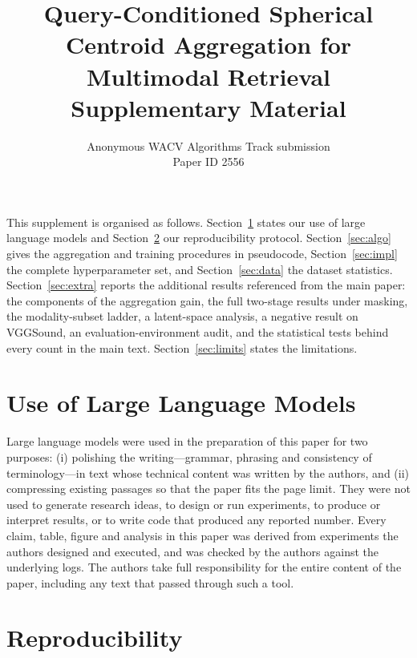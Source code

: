 \documentclass[10pt,twocolumn,letterpaper]{article}
\title{\Large Query-Conditioned Spherical Centroid Aggregation for\\
       Multimodal Retrieval\\[2mm]
       \large Supplementary Material}
\author{Anonymous WACV Algorithms Track submission\\Paper ID 2556}
\date{}
\begin{document}
\maketitle

\noindent
This supplement is organised as follows. Section~\ref{sec:llm} states our use of
large language models and Section~\ref{sec:repro} our reproducibility protocol.
Section~\ref{sec:algo} gives the aggregation and training procedures in
pseudocode, Section~\ref{sec:impl} the complete hyperparameter set, and
Section~\ref{sec:data} the dataset statistics. Section~\ref{sec:extra} reports
the additional results referenced from the main paper: the components of the
aggregation gain, the full two-stage results under masking, the modality-subset
ladder, a latent-space analysis, a negative result on VGGSound, an
evaluation-environment audit, and the statistical tests behind every count in
the main text. Section~\ref{sec:limits} states the limitations.

\section{Use of Large Language Models}
\label{sec:llm}

Large language models were used in the preparation of this paper for two
purposes: (i) polishing the writing---grammar, phrasing and consistency of
terminology---in text whose technical content was written by the authors, and
(ii) compressing existing passages so that the paper fits the page limit. They
were not used to generate research ideas, to design or run experiments, to
produce or interpret results, or to write code that produced any reported
number. Every claim, table, figure and analysis in this paper was derived from
experiments the authors designed and executed, and was checked by the authors
against the underlying logs. The authors take full responsibility for the
entire content of the paper, including any text that passed through such a
tool.

\section{Reproducibility}
\label{sec:repro}
\end{document}
